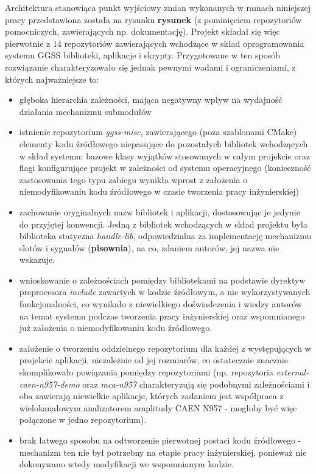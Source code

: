 Architektura stanowiąca punkt wyjściowy zmian wykonanych w ramach niniejszej pracy przedstawiona została na rysunku \textbf{rysunek} (z pominięciem repozytoriów pomocniczych, zawierających np. dokumentację). Projekt składał się więc pierwotnie z 14 repozytoriów zawierających wchodzące w skład oprogramowania systemu GGSS biblioteki, aplikacje i skrypty. Przygotowane w ten sposób rozwiązanie charakteryzowało się jednak pewnymi wadami i ograniczeniami, z których najważniejsze to:
\begin{itemize}
    \item głęboka hierarchia zależności, mająca negatywny wpływ na wydajność działania mechanizmu submodułów
    \item istnienie repozytorium \emph{ggss-misc}, zawierającego (poza szablonami CMake) elementy kodu źródłowego niepasujące do pozostałych bibliotek wchodzących w skład systemu: bazowe klasy wyjątków stosowanych w całym projekcie oraz flagi konfigurujące projekt w zależności od systemu operacyjnego (konieczność zastosowania tego typu zabiegu wynikła wprost z założenia o niemodyfikowaniu kodu źródłowego w czasie tworzenia pracy inżynierskiej)
    \item zachowanie oryginalnych nazw bibliotek i aplikacji, dostosowując je jedynie do przyjętej konwencji. Jedną z bibliotek wchodzących w skład projektu była biblioteka statyczna \emph{handle-lib}, odpowiedzialna za implementację mechanizmu slotów i sygnałów (\textbf{pisownia}), na co, zdaniem autorów, jej nazwa nie wskazuje.
    \item wnioskowanie o zależnościach pomiędzy bibliotekami na podstawie dyrektyw preprocesora \emph{include} zawartych w kodzie źródłowym, a nie wykorzystywanych funkcjonalności, co wynikało z niewielkiego doświadczenia i wiedzy autorów na temat systemu podczas tworzenia pracy inżynierskiej oraz wspomnianego już założenia o niemodyfikowaniu kodu źródłowego.
    \item założenie o tworzeniu oddzielnego repozytorium dla każdej z występujących w projekcie aplikacji, niezależnie od jej rozmiarów, co ostatecznie znacznie skomplikowało powiązania pomiędzy repozytoriami (np. repozytoria \emph{external-caen-n957-demo} oraz \emph{mca-n957} charakteryzują się podobnymi zależnościami i oba zawierają niewielkie aplikacje, których zadaniem jest współpraca z wielokanałowym analizatorem amplitudy CAEN N957 - mogłoby być więc połączone w jedno repozytorium).
    \item brak łatwego sposobu na odtworzenie pierwotnej postaci kodu źródłowego - mechanizm ten nie był potrzebny na etapie pracy inżynierskiej, ponieważ nie dokonywano wtedy modyfikacji we wspomnianym kodzie.
\end{itemize}


